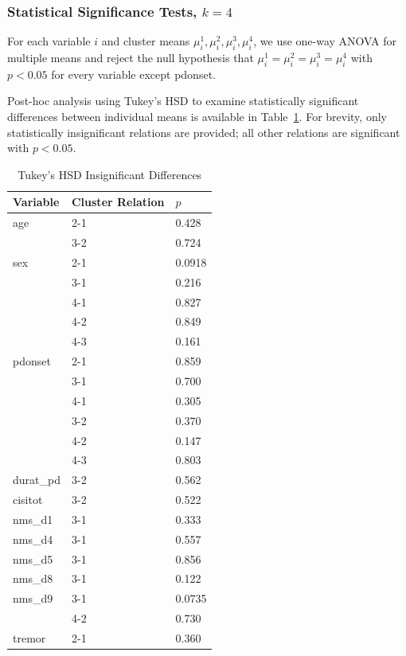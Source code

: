 \documentclass[10pt]{article}
\begin{document}
\subsubsection{Statistical Significance Tests, $k = 4$}
For each variable $i$ and cluster means $\mu_i^1, \mu_i^2, \mu_i^3, \mu_i^4$,
we use one-way ANOVA for multiple means and reject the null hypothesis that
$\mu_i^1 = \mu_i^2 = \mu_i^3 = \mu_i^4$ with $p < 0.05$ for every variable
except pdonset.

Post-hoc analysis using Tukey's HSD to examine statistically significant
differences between individual means is available in Table~\ref{tab:tukeyhsd}.
For brevity, only statistically insignificant relations are provided; all other
relations are significant with $p < 0.05$.

\begin{table}[h]
  \centering
  \begin{tabular}{l|l|l}
  Variable & Cluster Relation & $p$ \\
  \hline
age & 2-1 & 0.428 \\
    & 3-2 & 0.724 \\
    \hline
sex & 2-1 & 0.0918 \\
    & 3-1 & 0.216 \\
    & 4-1 & 0.827 \\
    & 4-2 & 0.849 \\
    & 4-3 & 0.161 \\
    \hline
pdonset & 2-1 & 0.859 \\
        & 3-1 & 0.700 \\
        & 4-1 & 0.305 \\
        & 3-2 & 0.370 \\
        & 4-2 & 0.147 \\
        & 4-3 & 0.803 \\
\hline
durat\_pd & 3-2 & 0.562 \\
\hline
cisitot & 3-2 & 0.522 \\
\hline
nms\_d1 & 3-1 & 0.333 \\
\hline
nms\_d4 & 3-1 & 0.557 \\
\hline
nms\_d5 & 3-1 & 0.856 \\
\hline
nms\_d8 & 3-1 & 0.122 \\
\hline
nms\_d9 & 3-1 & 0.0735 \\
       & 4-2 & 0.730 \\
\hline
tremor & 2-1 & 0.360 \\
  \end{tabular}
  \caption{Tukey's HSD Insignificant Differences}
  \label{tab:tukeyhsd}
\end{table}
\end{document}
